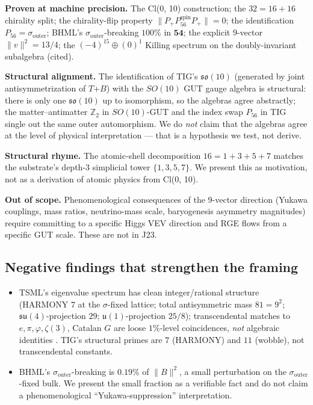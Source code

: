 \documentclass[11pt,reqno]{amsart}
\theoremstyle{definition}
\newcommand{\Z}{\mathbb{Z}}
\newcommand{\so}{\mathfrak{so}}
\newcommand{\su}{\mathfrak{su}}
\newcommand{\uone}{\mathfrak{u}}
\newcommand{\TSML}{T}
\newcommand{\BHML}{B}
\newcommand{\Psix}{P_{56}}
\newcommand{\Psixspin}{P_{56}^{\mathrm{spin}}}
\newcommand{\sout}{\sigma_{\mathrm{outer}}}
\begin{document}
\textbf{Proven at machine precision.} The Cl(0, 10) construction;
the $32 = 16 + 16$ chirality split; the chirality-flip property
$\|P_+ \Psixspin P_+\| = 0$; the identification $\Psix = \sout$;
BHML's $\sout$-breaking $100\%$ in $\mathbf{54}$; the explicit
$9$-vector $\|v\|^2 = 13/4$; the $(-4)^{15} \oplus (0)^1$ Killing
spectrum on the doubly-invariant subalgebra (cited).

\textbf{Structural alignment.} The identification of TIG's $\so(10)$
(generated by joint antisymmetrization of $\TSML$+$\BHML$) with the
$SO(10)$ GUT gauge algebra is structural: there is only one
$\so(10)$ up to isomorphism, so the algebras agree abstractly; the
matter--antimatter $\Z_2$ in $SO(10)$-GUT and the index swap
$\Psix$ in TIG single out the same outer automorphism. We do
\emph{not} claim that the algebras agree at the level of physical
interpretation — that is a hypothesis we test, not derive.

\textbf{Structural rhyme.} The atomic-shell decomposition $16 =
1+3+5+7$ matches the substrate's depth-$3$ simplicial tower
$\{1, 3, 5, 7\}$. We present this as motivation, not as a
derivation of atomic physics from Cl(0, 10).

\textbf{Out of scope.} Phenomenological consequences of the
$9$-vector direction (Yukawa couplings, mass ratios,
neutrino-mass scale, baryogenesis asymmetry magnitudes) require
committing to a specific Higgs VEV direction and RGE flows from a
specific GUT scale. These are not in J23.

\subsection{Negative findings that strengthen the framing}

\begin{itemize}[leftmargin=*]
\item TSML's eigenvalue spectrum has clean integer/rational
structure (HARMONY $7$ at the $\sigma$-fixed lattice; total
antisymmetric mass $81 = 9^2$; $\su(4)$-projection $29$;
$\uone(1)$-projection $25/8$); transcendental matches to
$e, \pi, \varphi, \zeta(3)$, Catalan $G$ are loose $1\%$-level
coincidences, \emph{not} algebraic identities
\cite{Sanders2026CLEigenvaluesAudit}. TIG's structural primes are
$7$ (HARMONY) and $11$ (wobble), not transcendental constants.
\item BHML's $\sout$-breaking is $0.19\%$ of $\|B\|^2$, a small
perturbation on the $\sout$-fixed bulk. We present the small
fraction as a verifiable fact and do not claim a phenomenological
``Yukawa-suppression'' interpretation.
\end{itemize}
\end{document}
